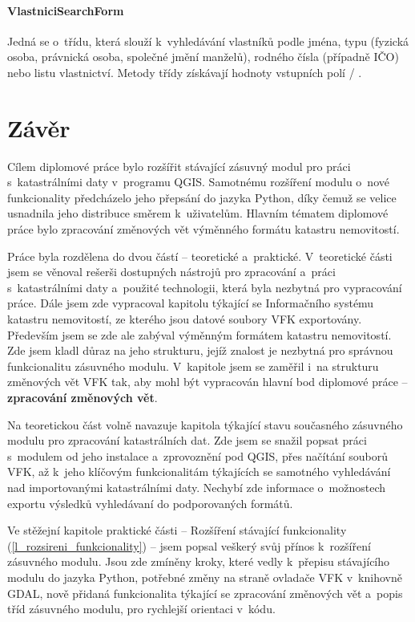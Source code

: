 \documentclass[a4paper,12pt,oneside]{book}
\begin{document}
\subsubsection{VlastniciSearchForm}
Jedná se o~třídu, která slouží k~vyhledávání vlastníků podle jména, typu (fyzická osoba, právnická osoba, společné jmění manželů), rodného čísla (případně IČO) nebo listu vlastnictví. Metody třídy získávají hodnoty vstupních polí / .


\clearpage
\chapter*{Závěr}

Cílem diplomové práce bylo rozšířit stávající zásuvný modul pro práci s~katastrálními daty v~programu QGIS. Samotnému rozšíření modulu o~nové funkcionality předcházelo jeho přepsání do jazyka Python, díky čemuž se velice usnadnila jeho distribuce směrem k~uživatelům. Hlavním tématem diplomové práce bylo zpracování změnových vět výměnného formátu katastru nemovitostí. 

Práce byla rozdělena do dvou částí -- teoretické a~praktické. V~teoretické části jsem se věnoval rešerši dostupných nástrojů pro zpracování a~práci s~katastrálními daty a~použité technologii, která byla nezbytná pro vypracování práce. Dále jsem zde vypracoval kapitolu týkající se Informačního systému katastru nemovitostí, ze kterého jsou datové soubory VFK exportovány. Především jsem se zde ale zabýval výměnným formátem katastru nemovitostí. Zde jsem kladl důraz na jeho strukturu, jejíž znalost je nezbytná pro správnou funkcionalitu zásuvného modulu. V~kapitole jsem se zaměřil i~na strukturu změnových vět VFK tak, aby mohl být vypracován hlavní bod diplomové práce -- \textbf{zpracování změnových vět}.

Na teoretickou část volně navazuje kapitola týkající stavu současného zásuvného modulu pro zpracování katastrálních dat. Zde jsem se snažil popsat práci s~modulem od jeho instalace a~zprovoznění pod QGIS, přes načítání souborů VFK, až k~jeho klíčovým funkcionalitám týkajících se samotného vyhledávání nad importovanými katastrálními daty. Nechybí zde informace o~možnostech exportu výsledků vyhledávaní do podporovaných formátů.

Ve stěžejní kapitole praktické části -- Rozšíření stávající funkcionality (\ref{l_rozsireni_funkcionality}) -- jsem popsal veškerý svůj přínos k~rozšíření zásuvného modulu. Jsou zde zmíněny kroky, které vedly k~přepisu stávajícího modulu do jazyka Python, potřebné změny na straně ovladače VFK v~knihovně GDAL, nově přidaná funkcionalita týkající se zpracování změnových vět a~popis tříd zásuvného modulu, pro rychlejší orientaci v~kódu.
\end{document}
